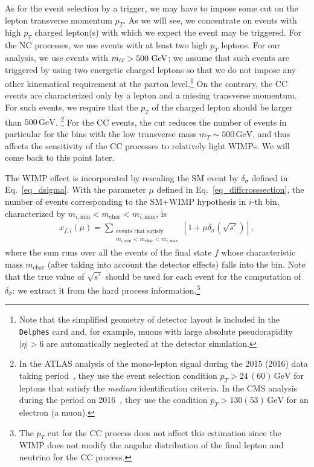 \documentclass[12pt,twoside,book]{article}
\begin{document}
As for the event selection by a trigger, we may have to impose some cut on the lepton transverse momentum $p_T$.
As we will see, we concentrate on events with high $p_T$ charged lepton(s) with which we expect the event may be triggered.
For the NC processes, we use events with at least two high $p_T$ leptons.  For our analysis, we use events with $m_{\ell\ell}>500\ {\rm GeV}$; we assume that such events are triggered by using two energetic charged leptons so that we do not impose any other kinematical requirement at the parton level.\footnote{
  Note that the simplified geometry of detector layout is included in the \texttt{Delphes} card and, for example, muons with large absolute pseudorapidity $|\eta| > 6$ are automatically neglected at the detector simulation.
}
On the contrary, the CC events are characterized only by a lepton and a missing transverse momentum.
For such events, we require that the $p_T$ of the charged lepton should be larger than $500\,\mathrm{GeV}$.
\footnote{
  In the ATLAS analysis of the mono-lepton signal during the 2015 (2016) data taking period~\cite{Aaboud:2017efa}, they use the event selection condition $p_T > 24\, (60)\,\mathrm{GeV}$ for leptons that satisfy the \textit{medium} identification criteria.
  In the CMS analysis during the period on 2016~\cite{Sirunyan:2018mpc}, they use the condition $p_T > 130 (53)\, \mathrm{GeV}$ for an electron (a muon).
}
For the CC events, the cut reduces the number of events in particular for the bins with the low transverse mass $m_T \sim 500\, \mathrm{GeV}$, and thus affects the sensitivity of the CC processes to relatively light WIMPs.
We will come back to this point later.


The WIMP effect is incorporated by rescaling the SM event by $\delta_\sigma$ defined in Eq.~\eqref{eq_dsigma}.
With the parameter $\mu$ defined in Eq.~\eqref{eq_diffcrosssection}, the number of events corresponding to the SM+WIMP hypothesis in $i$-th bin, characterized by $m_{i, \mathrm{min}} < m_{\mathrm{char}} < m_{i, \mathrm{max}}$, is
\begin{align}
  x_{f,i} (\mu) = \sum_{\substack{\text{events that satisfy}\\m_{i, \mathrm{min}} < m_{\mathrm{char}} < m_{i, \mathrm{max}}}}
  \left[
    1 + \mu \delta_\sigma (\sqrt{s'})
  \right],
  \label{eq_n_tot}
\end{align}
where the sum runs over all the events of the final state $f$ whose characteristic mass $m_{\mathrm{char}}$ (after taking into account the detector effects) falls into the bin.
Note that the true value of $\sqrt{s'}$ should be used for each event for the computation of $\delta_\sigma$: we extract it from the hard process information.\footnote
{
	The $p_T$ cut for the CC process does not affect this estimation since the WIMP does not modify the angular distribution of the final lepton and neutrino for the CC process.
}
\end{document}
